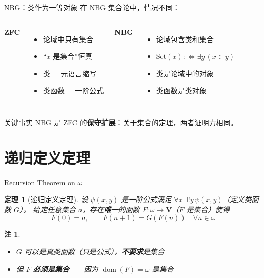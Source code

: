 \documentclass[10pt,aspectratio=169]{beamer}
\newtheorem{thm}{定理}[section]
\newtheorem{rmk}{注}[section]
\newcommand{\VV}{\mathbf{V}}
\DeclareMathOperator{\dom}{dom}
\begin{document}
\begin{frame}{NBG：类作为一等对象}
  在 NBG 集合论中，情况不同：

  \medskip
  \begin{columns}[T]
    \textbf{ZFC}
    \begin{itemize}
      \item 论域中只有集合
      \item ``$x$ 是集合''恒真
      \item 类 = 元语言缩写
      \item 类函数 = 一阶公式
    \end{itemize}

    \textbf{NBG}
    \begin{itemize}
      \item 论域包含类和集合
      \item $\mathrm{Set}(x) :\Leftrightarrow \exists y\, (x \in y)$
      \item 类是论域中的对象
      \item 类函数是类对象
    \end{itemize}
  \end{columns}

  \medskip
  \begin{block}{关键事实}
    NBG 是 ZFC 的\textbf{保守扩展}：关于集合的定理，两者证明力相同。
  \end{block}
\end{frame}

\section{递归定义定理}

\begin{frame}{Recursion Theorem on $\omega$}
  \begin{thm}[递归定义定理]
    设 $\psi(x,y)$ 是一阶公式满足 $\forall x\, \exists! y\, \psi(x,y)$（定义类函数 $G$）。
    给定任意集合 $a$，存在\textbf{唯一}的函数 $F: \omega \to \VV$（$F$ 是集合）使得
    \[
      F(0) = a, \qquad F(n+1) = G(F(n)) \quad \forall n \in \omega
    \]
  \end{thm}

  \begin{rmk}
    \begin{itemize}
      \item $G$ 可以是真类函数（只是公式），\textbf{不要求}是集合
      \item 但 $F$ \textbf{必须是集合}——因为 $\dom(F) = \omega$ 是集合
    \end{itemize}
  \end{rmk}
\end{frame}
\end{document}
